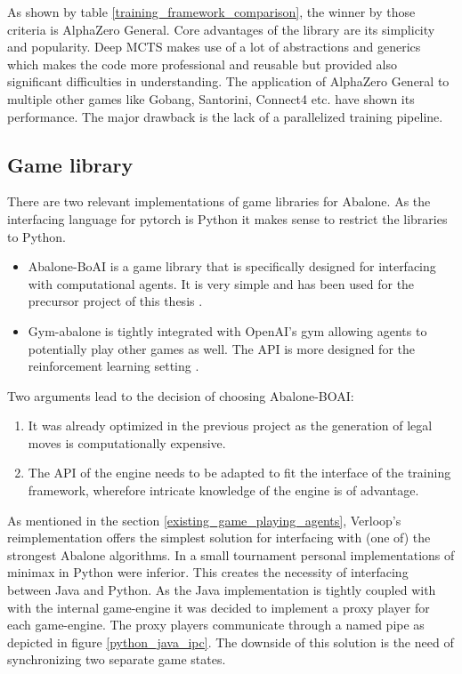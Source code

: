 As shown by table \ref{training_framework_comparison}, the winner by those criteria is AlphaZero General. Core advantages of the library are its simplicity and popularity. Deep MCTS makes use of a lot of abstractions and generics which makes the code more professional and reusable but provided also significant difficulties in understanding. The application of AlphaZero General to multiple other games like Gobang, Santorini, Connect4 etc. have shown its performance. The major drawback is the lack of a parallelized training pipeline.

\subsection{Game library}
There are two relevant implementations of game libraries for Abalone. As the interfacing language for pytorch is Python it makes sense to restrict the libraries to Python.

\begin{itemize}
    \item Abalone-BoAI is a game library that is specifically designed for interfacing with computational agents. It is very simple and has been used for the precursor project of this thesis \cite{scriptim_scriptimabalone-boai_2021}.
    \item Gym-abalone is tightly integrated with OpenAI's gym allowing agents to potentially play other games as well. The API is more designed for the reinforcement learning setting \cite{towzeur_towzeurgym-abalone_2021}.
\end{itemize}

Two arguments lead to the decision of choosing Abalone-BOAI:
\begin{enumerate}
    \item It was already optimized in the previous project as the generation of legal moves is computationally expensive.
    \item The API of the engine needs to be adapted to fit the interface of the training framework, wherefore intricate knowledge of the engine is of advantage.
\end{enumerate}

As mentioned in the section \ref{existing_game_playing_agents}, Verloop's reimplementation \cite{verloop_abaloneai_nodate} offers the simplest solution for interfacing with (one of) the strongest Abalone algorithms. In a small tournament personal implementations of minimax in Python \cite{claussen_abalone_2021} were inferior. This creates the necessity of interfacing between Java and Python. As the Java implementation is tightly coupled with with the internal game-engine it was decided to implement a proxy player for each game-engine. The proxy players communicate through a named pipe as depicted in figure \ref{python_java_ipc}. The downside of this solution is the need of synchronizing two separate game states.

